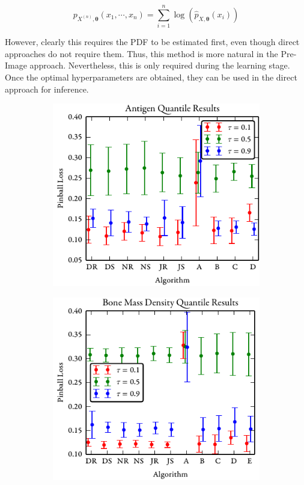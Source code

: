 \documentclass[twoside]{article} \usepackage{aistats2017}
\theoremstyle{definition}
\theoremstyle{theorem}
\newcommand{\rv}[1]{{#1}}
\begin{document}
	\begin{equation}
		p_{\rv{X}^{(n)}, \bm{\theta}}(x_{1}, \cdots, x_{n}) = \sum_{i = 1}^{n} \log(\hat{p}_{\rv{X}, \bm{\theta}}(x_{i}))
	\label{eq:lml}
	\end{equation}
	
	However, clearly this requires the PDF to be estimated first, even though direct approaches do not require them. Thus, this method is more natural in the Pre-Image approach. Nevertheless, this is only required during the learning stage. Once the optimal hyperparameters are obtained, they can be used in the direct approach for inference.
	
	\begin{figure}[t]
		\centering
		\begin{subfigure}[b]{0.32\textwidth}
			\includegraphics[width=\textwidth]{figures/Antigen_results}
		\end{subfigure}
		\begin{subfigure}[b]{0.32\textwidth}
			\includegraphics[width=\textwidth]{figures/Bone_Mass_Density_results}

\end{subfigure}
\end{figure}
\end{document}
